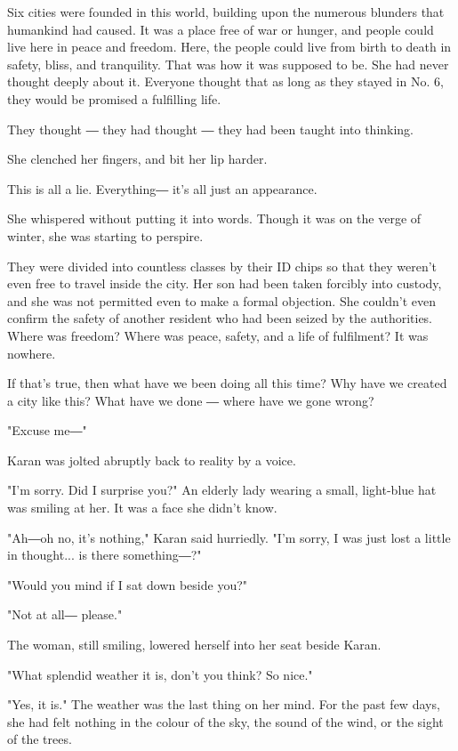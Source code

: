 Six cities were founded in this world, building upon the numerous
blunders that humankind had caused. It was a place free of war or
hunger, and people could live here in peace and freedom. Here, the
people could live from birth to death in safety, bliss, and tranquility.
That was how it was supposed to be. She had never thought deeply about
it. Everyone thought that as long as they stayed in No. 6, they would be
promised a fulfilling life.

They thought ― they had thought ― they had been taught into thinking.

She clenched her fingers, and bit her lip harder.

This is all a lie. Everything― it's all just an appearance.

She whispered without putting it into words. Though it was on the verge
of winter, she was starting to perspire.

They were divided into countless classes by their ID chips so that they
weren't even free to travel inside the city. Her son had been taken
forcibly into custody, and she was not permitted even to make a formal
objection. She couldn't even confirm the safety of another resident who
had been seized by the authorities. Where was freedom? Where was peace,
safety, and a life of fulfilment? It was nowhere.

If that's true, then what have we been doing all this time? Why have we
created a city like this? What have we done ― where have we gone wrong?

"Excuse me―"

Karan was jolted abruptly back to reality by a voice.

"I'm sorry. Did I surprise you?" An elderly lady wearing a small,
light-blue hat was smiling at her. It was a face she didn't know.

"Ah―oh no, it's nothing," Karan said hurriedly. "I'm sorry, I was just
lost a little in thought... is there something―?"

"Would you mind if I sat down beside you?"

"Not at all― please."

The woman, still smiling, lowered herself into her seat beside Karan.

"What splendid weather it is, don't you think? So nice."

"Yes, it is." The weather was the last thing on her mind. For the past
few days, she had felt nothing in the colour of the sky, the sound of
the wind, or the sight of the trees.

